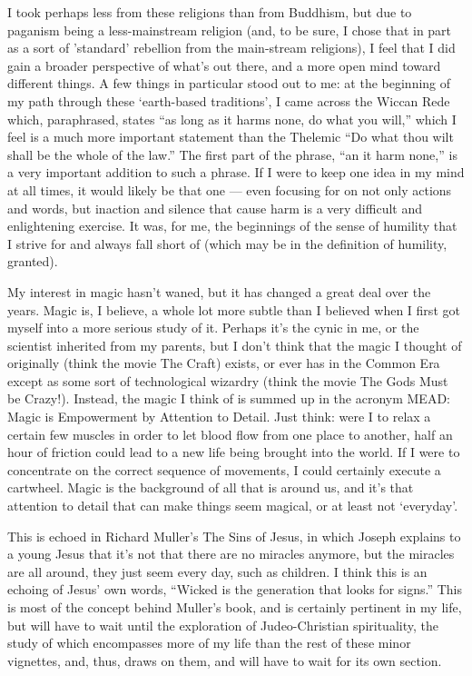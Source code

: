 \documentclass{book}
\begin{document}
I took perhaps less from these religions than from Buddhism, but due to
paganism being a less-mainstream religion (and, to be sure, I chose that
in part as a sort of 'standard' rebellion from the main-stream
religions), I feel that I did gain a broader perspective of what's out
there, and a more open mind toward different things.  A few things in
particular stood out to me: at the beginning of my path through these
`earth-based traditions', I came across the Wiccan Rede which,
paraphrased, states ``as long as it harms none, do what you will,''
which I feel is a much more important statement than the Thelemic ``Do
what thou wilt shall be the whole of the law.'' The first part of the
phrase, ``an it harm none,'' is a very important addition to such a
phrase.  If I were to keep one idea in my mind at all times, it would
likely be that one --- even focusing for on not only actions and words,
but inaction and silence that cause harm is a very difficult and
enlightening exercise.  It was, for me, the beginnings of the sense of
humility that I strive for and always fall short of (which may be in the
definition of humility, granted).

My interest in magic hasn't waned, but it has changed a great deal over
the years.  Magic is, I believe, a whole lot more subtle than I believed
when I first got myself into a more serious study of it.  Perhaps it's
the cynic in me, or the scientist inherited from my parents, but I don't
think that the magic I thought of originally (think the movie The Craft)
exists, or ever has in the Common Era except as some sort of
technological wizardry (think the movie The Gods Must be Crazy!).
Instead, the magic I think of is summed up in the acronym MEAD: Magic is
Empowerment by Attention to Detail.  Just think: were I to relax a
certain few muscles in order to let blood flow from one place to
another, half an hour of friction could lead to a new life being brought
into the world.  If I were to concentrate on the correct sequence of
movements, I could certainly execute a cartwheel.  Magic is the
background of all that is around us, and it's that attention to detail
that can make things seem magical, or at least not `everyday'.

This is echoed in Richard Muller's The Sins of Jesus, in which Joseph
explains to a young Jesus that it's not that there are no miracles
anymore, but the miracles are all around, they just seem every day, such
as children.  I think this is an echoing of Jesus' own words, ``Wicked
is the generation that looks for signs.'' This is most of the concept
behind Muller's book, and is certainly pertinent in my life, but will
have to wait until the exploration of Judeo-Christian spirituality, the
study of which encompasses more of my life than the rest of these minor
vignettes, and, thus, draws on them, and will have to wait for its own
section.
\end{document}
